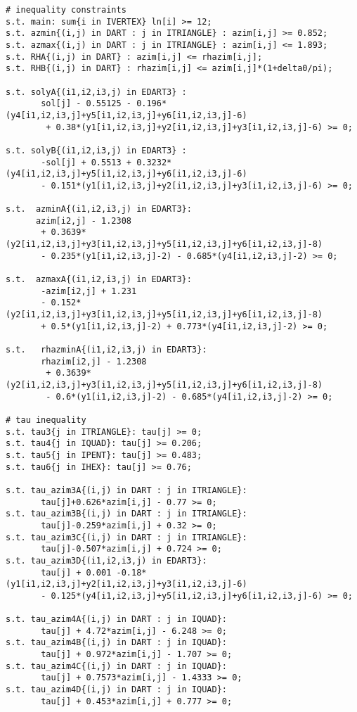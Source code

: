 \begin{verbatim}
# inequality constraints
s.t. main: sum{i in IVERTEX} ln[i] >= 12;
s.t. azmin{(i,j) in DART : j in ITRIANGLE} : azim[i,j] >= 0.852;
s.t. azmax{(i,j) in DART : j in ITRIANGLE} : azim[i,j] <= 1.893;
s.t. RHA{(i,j) in DART} : azim[i,j] <= rhazim[i,j];
s.t. RHB{(i,j) in DART} : rhazim[i,j] <= azim[i,j]*(1+delta0/pi);

s.t. solyA{(i1,i2,i3,j) in EDART3} : 
       sol[j] - 0.55125 - 0.196*(y4[i1,i2,i3,j]+y5[i1,i2,i3,j]+y6[i1,i2,i3,j]-6) 
        + 0.38*(y1[i1,i2,i3,j]+y2[i1,i2,i3,j]+y3[i1,i2,i3,j]-6) >= 0;

s.t. solyB{(i1,i2,i3,j) in EDART3} : 
       -sol[j] + 0.5513 + 0.3232*(y4[i1,i2,i3,j]+y5[i1,i2,i3,j]+y6[i1,i2,i3,j]-6) 
       - 0.151*(y1[i1,i2,i3,j]+y2[i1,i2,i3,j]+y3[i1,i2,i3,j]-6) >= 0;

s.t.  azminA{(i1,i2,i3,j) in EDART3}: 
      azim[i2,j] - 1.2308 
       + 0.3639*(y2[i1,i2,i3,j]+y3[i1,i2,i3,j]+y5[i1,i2,i3,j]+y6[i1,i2,i3,j]-8) 
       - 0.235*(y1[i1,i2,i3,j]-2) - 0.685*(y4[i1,i2,i3,j]-2) >= 0;

s.t.  azmaxA{(i1,i2,i3,j) in EDART3}: 
       -azim[i2,j] + 1.231 
       - 0.152*(y2[i1,i2,i3,j]+y3[i1,i2,i3,j]+y5[i1,i2,i3,j]+y6[i1,i2,i3,j]-8) 
       + 0.5*(y1[i1,i2,i3,j]-2) + 0.773*(y4[i1,i2,i3,j]-2) >= 0;

s.t.   rhazminA{(i1,i2,i3,j) in EDART3}: 
       rhazim[i2,j] - 1.2308 
        + 0.3639*(y2[i1,i2,i3,j]+y3[i1,i2,i3,j]+y5[i1,i2,i3,j]+y6[i1,i2,i3,j]-8) 
        - 0.6*(y1[i1,i2,i3,j]-2) - 0.685*(y4[i1,i2,i3,j]-2) >= 0;

# tau inequality
s.t. tau3{j in ITRIANGLE}: tau[j] >= 0;
s.t. tau4{j in IQUAD}: tau[j] >= 0.206;
s.t. tau5{j in IPENT}: tau[j] >= 0.483;
s.t. tau6{j in IHEX}: tau[j] >= 0.76;

s.t. tau_azim3A{(i,j) in DART : j in ITRIANGLE}: 
       tau[j]+0.626*azim[i,j] - 0.77 >= 0;
s.t. tau_azim3B{(i,j) in DART : j in ITRIANGLE}: 
       tau[j]-0.259*azim[i,j] + 0.32 >= 0;
s.t. tau_azim3C{(i,j) in DART : j in ITRIANGLE}: 
       tau[j]-0.507*azim[i,j] + 0.724 >= 0;
s.t. tau_azim3D{(i1,i2,i3,j) in EDART3}: 
       tau[j] + 0.001 -0.18*(y1[i1,i2,i3,j]+y2[i1,i2,i3,j]+y3[i1,i2,i3,j]-6) 
       - 0.125*(y4[i1,i2,i3,j]+y5[i1,i2,i3,j]+y6[i1,i2,i3,j]-6) >= 0;

s.t. tau_azim4A{(i,j) in DART : j in IQUAD}: 
       tau[j] + 4.72*azim[i,j] - 6.248 >= 0;
s.t. tau_azim4B{(i,j) in DART : j in IQUAD}: 
       tau[j] + 0.972*azim[i,j] - 1.707 >= 0;
s.t. tau_azim4C{(i,j) in DART : j in IQUAD}: 
       tau[j] + 0.7573*azim[i,j] - 1.4333 >= 0;
s.t. tau_azim4D{(i,j) in DART : j in IQUAD}: 
       tau[j] + 0.453*azim[i,j] + 0.777 >= 0;
\end{verbatim}